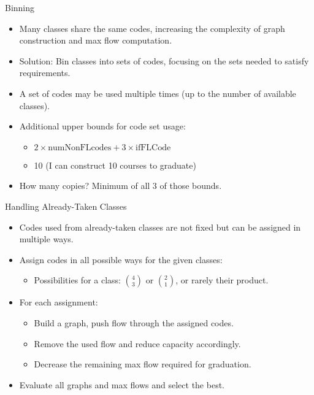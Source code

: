 \documentclass{beamer}
\begin{document}
\begin{frame}{Binning}
    \begin{itemize}
        \item Many classes share the same codes, increasing the complexity of graph construction and max flow computation.
        \item Solution: Bin classes into sets of codes, focusing on the sets needed to satisfy requirements.
        \item A set of codes may be used multiple times (up to the number of available classes).
        \item Additional upper bounds for code set usage:
        \begin{itemize}
            \item \( 2 \times \text{numNonFLcodes} + 3 \times \text{ifFLCode} \)
            \item 10 (I can construct 10 courses to graduate)
        \end{itemize}
        \item How many copies? Minimum of all 3 of those bounds.
    \end{itemize}
    
\end{frame}

\begin{frame}{Handling Already-Taken Classes}
    \begin{itemize}
        \item Codes used from already-taken classes are not fixed but can be assigned in multiple ways.
        \item Assign codes in all possible ways for the given classes:
        \begin{itemize}
            \item Possibilities for a class: \( \binom{4}{3} \) or \( \binom{2}{1} \), or rarely their product.
        \end{itemize}
        \item For each assignment:
        \begin{itemize}
            \item Build a graph, push flow through the assigned codes.
            \item Remove the used flow and reduce capacity accordingly.
            \item Decrease the remaining max flow required for graduation.
        \end{itemize}
        \item Evaluate all graphs and max flows and select the best.
    \end{itemize}
   
\end{frame}
\end{document}
